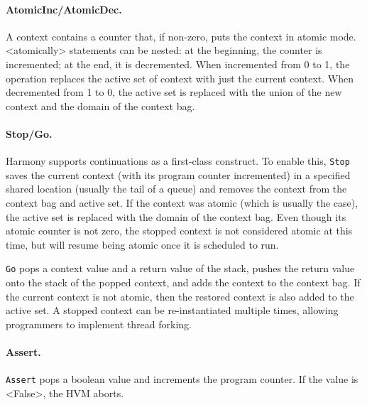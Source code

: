 \documentclass[twocolumn]{article}
\begin{document}
\paragraph{AtomicInc/AtomicDec.}  A context contains a counter that,
if non-zero, puts the context in atomic mode.
<{atomically}> statements can be nested: at the beginning, the
counter is incremented; at the end, it is decremented.
When incremented from 0 to 1, the operation replaces the active
set of context with just the current context.  When decremented
from 1 to 0, the active set is replaced with the union of the
new context and the domain of the context bag.

\paragraph{Stop/Go.}  Harmony supports continuations as a first-class
construct.  To enable this, \texttt{Stop} saves the current context (with
its program counter incremented) in a specified shared location (usually the
tail of a queue) and removes the context from the context bag and active set.
If the context was atomic (which is usually the case), the active set is
replaced with the domain of the context bag.  Even though its atomic counter
is not zero, the stopped context is not considered atomic at this time, but
will resume being atomic once it is scheduled to run.

\texttt{Go} pops a context value and a return value of the stack,
pushes the return value onto the stack of the popped context, and adds
the context to the context bag.  If the current context is not atomic,
then the restored context is also added to the active set.
A stopped context can be re-instantiated multiple times, allowing
programmers to implement thread forking.

\paragraph{Assert.}  \texttt{Assert} pops a boolean value and increments
the program counter.  If the value is <{False}>, the HVM aborts.
\end{document}
